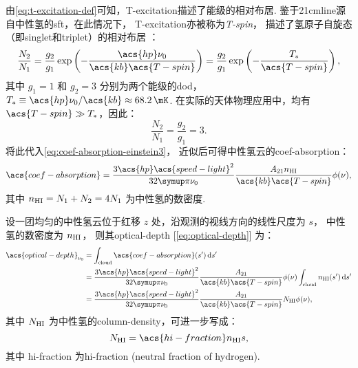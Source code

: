 由\autoref{eq:t-excitation-def}可知，\acl{T-excitation}描述了能级的相对布居.
鉴于\ac{21cmline}源自中性氢的\ac{sft}，在此情况下，
\acl{T-excitation}亦被称为\emph{\acf{T-spin}}，
描述了氢原子自旋态（即\ac{singlet}和\ac{triplet}）的相对布居 \cite{field1958}：
\begin{equation}
  \frac{N_2}{N_1} = \frac{g_2}{g_1}
    \exp\left( -\frac{\acs{hp} \nu_0}{\acs{kb} \acs{T-spin}} \right)
    = \frac{g_2}{g_1} \exp\left( -\frac{T_*}{\acs{T-spin}} \right),
\end{equation}
其中
$g_1 = 1$ 和 $g_2 = 3$ 分别为两个能级的\ac{dod}，
$T_* \equiv \acs{hp} \nu_0 / \acs{kb} \approx \SI{68.2}{\mK}$.
在实际的天体物理应用中，均有 $\acs{T-spin} \gg T_*$，因此：
\begin{equation}
  \frac{N_2}{N_1} = \frac{g_2}{g_1} = 3 .
\end{equation}
将此代入\autoref{eq:coef-absorption-einstein3}，
近似后可得中性氢云的\acl{coef-absorption}：
\begin{equation}
  \acs{coef-absorption}
    = \frac{3 \acs{hp} \acs{speed-light}^2}{32\Cpi \nu_0}
      \frac{A_{21} n_{\R{HI}}}{\acs{kb} \acs{T-spin}} \phi(\nu) ,
\end{equation}
其中 $n_{\mathrm{HI}} = N_1 + N_2 = 4 N_1$ 为中性氢的数密度.

设一团均匀的中性氢云位于红移 $z$ 处，沿观测的视线方向的线性尺度为 $s$，
中性氢的数密度为 $n_{\mathrm{HI}}$，
则其\acl{optical-depth} [\autoref{eq:optical-depth}] 为：
\begin{align}
  \acs{optical-depth}_{\nu_0}
    & = \int_{\R{cloud}} \acs{coef-absorption}(s') \,\D{s'}  \\
    & = \frac{3 \acs{hp} \acs{speed-light}^2}{32\Cpi \nu_0}
      \frac{A_{21}}{\acs{kb} \acs{T-spin}} \phi(\nu)
      \int_{\R{cloud}} n_{\R{HI}}(s') \,\D{s'}  \\
    & = \frac{3 \acs{hp} \acs{speed-light}^2}{32\Cpi \nu_0}
      \frac{A_{21}}{\acs{kb} \acs{T-spin}} N_{\R{HI}} \phi(\nu) ,
  \label{eq:21cm-optical-depth1}
\end{align}
其中 $N_{\mathrm{HI}}$ 为中性氢的\ac{column-density}，可进一步写成：
\begin{equation}
  \label{eq:column-density}
  N_{\R{HI}} = \acs{hi-fraction} n_{\R{HI}} s ,
\end{equation}
其中 \acs{hi-fraction} 为\acl{hi-fraction} (neutral fraction of hydrogen).

